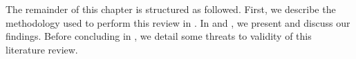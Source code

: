 The remainder of this chapter is structured as followed.
First, we describe the methodology used to perform this review in .
In  and , we present and discuss our findings.
Before concluding in , we detail some threats to validity of this literature review.

